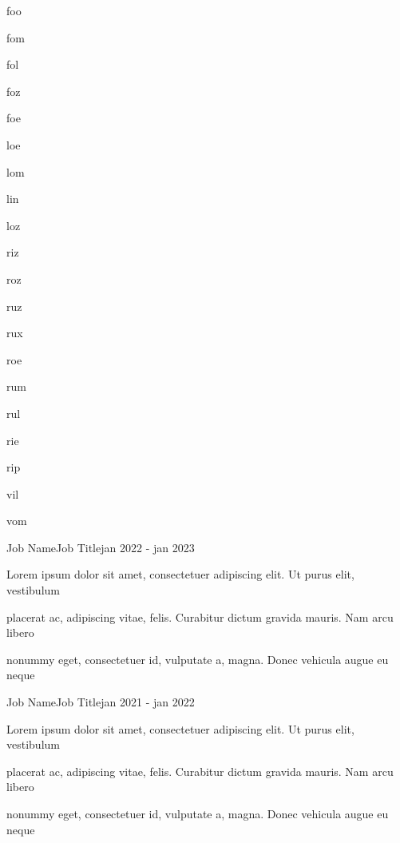 \documentclass{resume}
\begin{document}
\begin{skills}{4}
    \item foo
    \item fom
    \item fol
    \item foz
    \item foe
    \item loe
    \item lom
    \item lin
    \item loz
    \item riz
    \item roz
    \item ruz
    \item rux
    \item roe
    \item rum
    \item rul
    \item rie
    \item rip
    \item vil
    \item vom
\end{skills}


\begin{job}{Job Name}{Job Title}{jan 2022 - jan 2023}
    \vspace*{8pt}
    \begin{qualifications}
        \item Lorem ipsum dolor sit amet, consectetuer adipiscing elit. Ut purus elit, vestibulum
        \item placerat ac, adipiscing vitae, felis. Curabitur dictum gravida mauris. Nam arcu libero
        \item nonummy eget, consectetuer id, vulputate a, magna. Donec vehicula augue eu neque
    \end{qualifications}    
    \lipsum[1]
\end{job}

\begin{job}{Job Name}{Job Title}{jan 2021 - jan 2022}
    \vspace*{8pt}
    \begin{qualifications}
        \item Lorem ipsum dolor sit amet, consectetuer adipiscing elit. Ut purus elit, vestibulum
        \item placerat ac, adipiscing vitae, felis. Curabitur dictum gravida mauris. Nam arcu libero
        \item nonummy eget, consectetuer id, vulputate a, magna. Donec vehicula augue eu neque
    \end{qualifications}    
    \lipsum[2]
\end{job}
\end{document}
